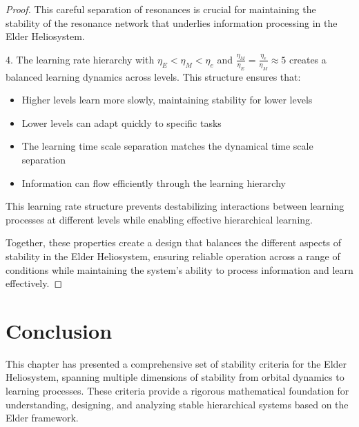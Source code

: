 \begin{proof}
This careful separation of resonances is crucial for maintaining the stability of the resonance network that underlies information processing in the Elder Heliosystem.

4. The learning rate hierarchy with $\eta_E < \eta_M < \eta_e$ and $\frac{\eta_M}{\eta_E} = \frac{\eta_e}{\eta_M} \approx 5$ creates a balanced learning dynamics across levels. This structure ensures that:
\begin{itemize}
    \item Higher levels learn more slowly, maintaining stability for lower levels
    \item Lower levels can adapt quickly to specific tasks
    \item The learning time scale separation matches the dynamical time scale separation
    \item Information can flow efficiently through the learning hierarchy
\end{itemize}

This learning rate structure prevents destabilizing interactions between learning processes at different levels while enabling effective hierarchical learning.

Together, these properties create a design that balances the different aspects of stability in the Elder Heliosystem, ensuring reliable operation across a range of conditions while maintaining the system's ability to process information and learn effectively.
\end{proof}

\section{Conclusion}

This chapter has presented a comprehensive set of stability criteria for the Elder Heliosystem, spanning multiple dimensions of stability from orbital dynamics to learning processes. These criteria provide a rigorous mathematical foundation for understanding, designing, and analyzing stable hierarchical systems based on the Elder framework.

